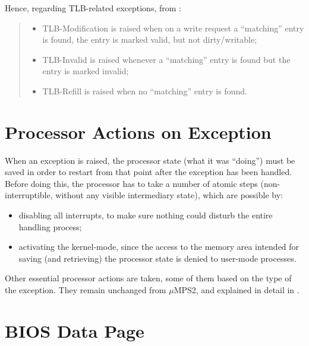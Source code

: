 \documentclass[12pt,a4paper,openright,twoside]{report}
\begin{document}
Hence, regarding TLB-related exceptions, from \cite{pops}:
\begin{quote}
	\begin{itemize}
		\item TLB-Modification is raised when on a write request a ``matching'' entry is found, the entry is marked valid, but not dirty/writable;
		\item TLB-Invalid is raised whenever a ``matching'' entry is found but the entry is marked invalid;
		\item TLB-Refill is raised when no ``matching'' entry is found.
	\end{itemize}
\end{quote}

\section{Processor Actions on Exception}
\label{chap:processor_actions_on_exceptions}
When an exception is raised, the processor state (what it was ``doing'') must be saved in order to restart from that point after the exception has been handled.
Before doing this, the processor has to take a number of atomic steps (non-interruptible, without any visible intermediary state), which are possible by:
\begin{itemize}
	\item disabling all interrupts, to make sure nothing could disturb the entire handling process;
	\item activating the kernel-mode, since the access to the memory area intended for saving (and retrieving) the processor state is denied to user-mode processes.
\end{itemize}

Other essential processor actions are taken, some of them based on the type of the exception.
They remain unchanged from $\mu$MPS2, and explained in detail in \cite{pops}.

\section{BIOS Data Page}
\label{chap:bios_data_page}
\end{document}
